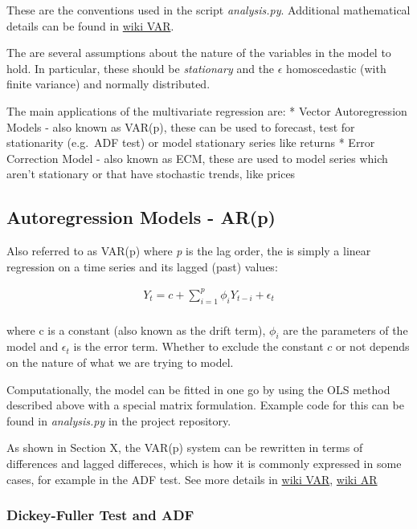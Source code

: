 \documentclass{article}
\begin{document}
These are the conventions used in the script \emph{analysis.py}.
Additional mathematical details can be found in
\href{https://en.wikipedia.org/wiki/Vector_autoregression}{wiki VAR}.

The are several assumptions about the nature of the variables in the
model to hold. In particular, these should be \emph{stationary} and the
\(\epsilon\) homoscedastic (with finite variance) and normally
distributed.

The main applications of the multivariate regression are: * Vector
Autoregression Models - also known as VAR(p), these can be used to
forecast, test for stationarity (e.g.~ADF test) or model stationary
series like returns * Error Correction Model - also known as ECM, these
are used to model series which aren't stationary or that have stochastic
trends, like prices

    \subsection{Autoregression Models -
AR(p)}\label{autoregression-models---arp}

Also referred to as VAR(p) where \emph{p} is the lag order, the is
simply a linear regression on a time series and its lagged (past)
values:

\[
\begin{align}
Y_t = c + \sum^{p}_{i=1} \phi_i Y_{t-i} + \epsilon_t \\
\end{align}
\]

where c is a constant (also known as the drift term), \(\phi_i\) are the
parameters of the model and \(\epsilon_t\) is the error term. Whether to
exclude the constant \(c\) or not depends on the nature of what we are
trying to model.

Computationally, the model can be fitted in one go by using the OLS
method described above with a special matrix formulation. Example code
for this can be found in \emph{analysis.py} in the project repository.

As shown in Section X, the VAR(p) system can be rewritten in terms of
differences and lagged differeces, which is how it is commonly expressed
in some cases, for example in the ADF test. See more details in
\href{https://en.wikipedia.org/wiki/Vector_autoregression}{wiki VAR},
\href{https://en.wikipedia.org/wiki/Autoregressive_model}{wiki AR}

    \subsubsection{Dickey-Fuller Test and
ADF}\label{dickey-fuller-test-and-adf}
\end{document}
